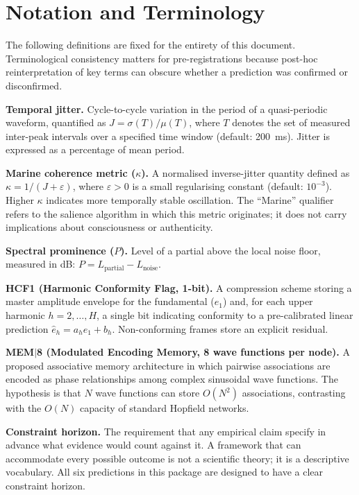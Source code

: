\documentclass[11pt, a4paper]{article}
\newcommand{\mem}{MEM$|$8}
\begin{document}
\section{Notation and Terminology}

The following definitions are fixed for the entirety of this document.
Terminological consistency matters for pre-registrations because post-hoc
reinterpretation of key terms can obscure whether a prediction was confirmed or
disconfirmed.

\begin{defbox}
\textbf{Temporal jitter.}  Cycle-to-cycle variation in the period of a quasi-periodic
waveform, quantified as $J = \sigma(T) / \mu(T)$, where $T$ denotes the set of
measured inter-peak intervals over a specified time window (default: 200~ms).
Jitter is expressed as a percentage of mean period.

\smallskip
\textbf{Marine coherence metric ($\kappa$).}  A normalised inverse-jitter quantity
defined as $\kappa = 1 / (J + \varepsilon)$, where $\varepsilon > 0$ is a small
regularising constant (default: $10^{-3}$).  Higher $\kappa$ indicates more
temporally stable oscillation.  The ``Marine'' qualifier refers to the salience
algorithm in which this metric originates; it does not carry implications about
consciousness or authenticity.

\smallskip
\textbf{Spectral prominence ($P$).}  Level of a partial above the local noise
floor, measured in dB: $P = L_\text{partial} - L_\text{noise}$.

\smallskip
\textbf{HCF1 (Harmonic Conformity Flag, 1-bit).}  A compression scheme storing a
master amplitude envelope for the fundamental ($e_1$) and, for each upper harmonic
$h = 2, \ldots, H$, a single bit indicating conformity to a pre-calibrated linear
prediction $\hat{e}_h = a_h e_1 + b_h$.  Non-conforming frames store an explicit
residual.

\smallskip
\textbf{\mem{} (Modulated Encoding Memory, 8 wave functions per node).}  A proposed
associative memory architecture in which pairwise associations are encoded as phase
relationships among complex sinusoidal wave functions.  The hypothesis is that $N$
wave functions can store $O(N^2)$ associations, contrasting with the $O(N)$
capacity of standard Hopfield networks.

\smallskip
\textbf{Constraint horizon.}  The requirement that any empirical claim specify in
advance what evidence would count against it.  A framework that can accommodate
every possible outcome is not a scientific theory; it is a descriptive vocabulary.
All six predictions in this package are designed to have a clear constraint horizon.


\end{defbox}
\end{document}

